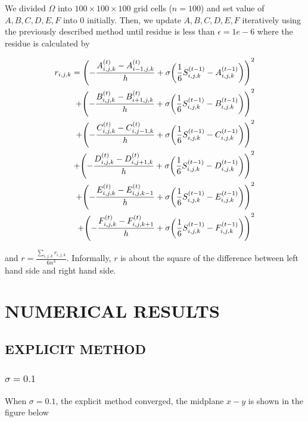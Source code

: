 We divided $\Omega$ into $100 \times 100 \times 100$ grid cells ($n = 100$) and set value of $A, B, C, D, E, F$ into $0$ initially. Then, we update $A, B, C, D, E, F$ iteratively using the previously described method until residue is less than $\epsilon = 1e-6$ where the residue is calculated by

\begin{align*}
	r_{i, j, k} = \tuple*{- \frac{A_{i, j, k}^{(t)} - A_{i-1, j, k}^{(t)}}{h} + \sigma \tuple*{\frac{1}{6} S_{i, j, k}^{(t-1)} - A_{i, j, k}^{(t-1)}}}^2 \\
	+ \tuple*{- \frac{B_{i, j, k}^{(t)} - B_{i+1, j, k}^{(t)}}{h} + \sigma \tuple*{\frac{1}{6} S_{i, j, k}^{(t-1)} - B_{i, j, k}^{(t-1)}}}^2 \\
	+ \tuple*{- \frac{C_{i, j, k}^{(t)} - C_{i, j-1, k}^{(t)}}{h} + \sigma \tuple*{\frac{1}{6} S_{i, j, k}^{(t-1)} - C_{i, j, k}^{(t-1)}}}^2 \\
	+ \tuple*{- \frac{D_{i, j, k}^{(t)} - D_{i, j+1, k}^{(t)}}{h} + \sigma \tuple*{\frac{1}{6} S_{i, j, k}^{(t-1)} - D_{i, j, k}^{(t-1)}}}^2 \\
	+ \tuple*{- \frac{E_{i, j, k}^{(t)} - E_{i, j, k-1}^{(t)}}{h} + \sigma \tuple*{\frac{1}{6} S_{i, j, k}^{(t-1)} - E_{i, j, k}^{(t-1)}}}^2 \\
	+ \tuple*{- \frac{F_{i, j, k}^{(t)} - F_{i, j, k+1}^{(t)}}{h} + \sigma \tuple*{\frac{1}{6} S_{i, j, k}^{(t-1)} - F_{i, j, k}^{(t-1)}}}^2
\end{align*}

and $r = \frac{\sum_{i, j, k} r_{i, j, k}}{6 n^3}$. Informally, $r$ is about the square of the difference between left hand side and right hand side.


\section{NUMERICAL RESULTS}

\subsection{EXPLICIT METHOD}

\subsubsection{$\sigma = 0.1$}

When $\sigma = 0.1$, the explicit method converged, the midplane $x-y$ is shown in the figure below

